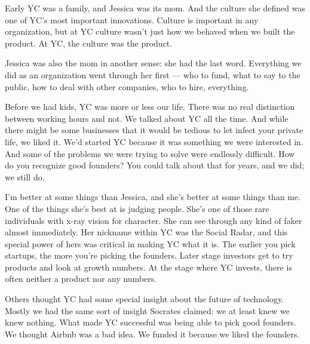 Early YC was a
                  family, and Jessica was its mom. And the culture she defined
                  was one of YC's most important innovations. Culture is
                  important in any organization, but at YC culture wasn't just
                  how we behaved when we built the product. At YC, the culture
                  was the product.

Jessica was also the mom in
                  another sense: she had the last word. Everything we did as an
                  organization went through her
                  first --- who to fund, what to say to the
                  public, how to deal with other companies, who to hire,
                  everything.

Before we had kids, YC was more or less
                  our life. There was no real distinction between working hours
                  and not. We talked about YC all the time. And while there
                  might be some businesses that it would be tedious to let
                  infect your private life, we liked it. We'd started YC because
                  it was something we were interested in. And some of the
                  problems we were trying to solve were endlessly difficult. How
                  do you recognize good founders? You could talk about that for
                  years, and we did; we still do.

I'm better at some
                  things than Jessica, and she's better at some things than me.
                  One of the things she's best at is judging people. She's one
                  of those rare individuals with x-ray vision for character. She
                  can see through any kind of faker almost immediately. Her
                  nickname within YC was the Social Radar, and this special
                  power of hers was critical in making YC what it is. The
                  earlier you pick startups, the more you're picking the
                  founders. Later stage investors get to try products and look
                  at growth numbers. At the stage where YC invests, there is
                  often neither a product nor any numbers.

Others
                  thought YC had some special insight about the future of
                  technology. Mostly we had the same sort of insight Socrates
                  claimed: we at least knew we knew nothing. What made YC
                  successful was being able to pick good founders. We thought
                  Airbnb was a bad idea. We funded it because we liked the
                  founders.

